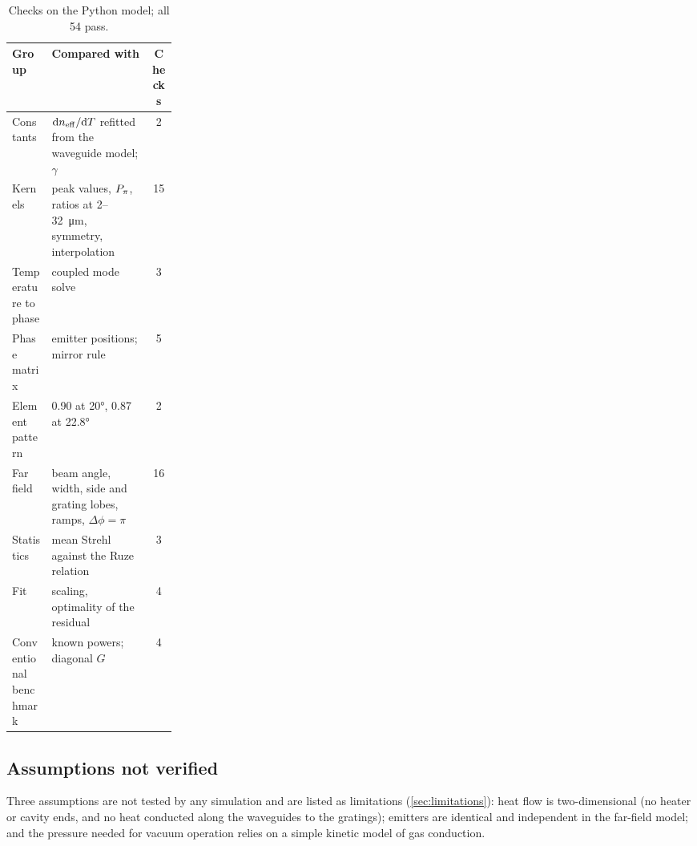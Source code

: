 \begin{table}[htbp]
  \centering
  \caption{Checks on the Python model; all \num{54} pass.}
  \label{tab:pipelinechecks}
  \small
  \begin{tabularx}{\linewidth}{@{}P{0.24\linewidth}Lc@{}}
    \toprule
    Group & Compared with & Checks \\
    \midrule
    Constants & $\mathrm{d}n_{\mathrm{eff}}/\mathrm{d}T$ refitted from the waveguide model; $\gamma$ & 2 \\
    Kernels & peak values, $P_{\pi}$, ratios at 2--\qty{32}{\micro\metre}, symmetry, interpolation & 15 \\
    Temperature to phase & coupled mode solve & 3 \\
    Phase matrix & emitter positions; mirror rule & 5 \\
    Element pattern & \num{0.90} at \ang{20}, \num{0.87} at \ang{22.8} & 2 \\
    Far field & beam angle, width, side and grating lobes, ramps, $\Delta\phi=\pi$ & 16 \\
    Statistics & mean Strehl against the Ruze relation & 3 \\
    Fit & scaling, optimality of the residual & 4 \\
    Conventional benchmark & known powers; diagonal $G$ & 4 \\
    \bottomrule
  \end{tabularx}
\end{table}
\subsection{Assumptions not verified}
\label{sec:notverified}

Three assumptions are not tested by any simulation and are listed as limitations (\cref{sec:limitations}): heat
flow is two-dimensional (no heater or cavity ends, and no heat conducted along the waveguides to the gratings);
emitters are identical and independent in the far-field model; and the pressure needed for vacuum operation relies on
a simple kinetic model of gas conduction.
